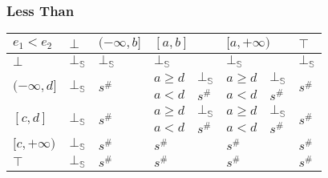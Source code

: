 \documentclass[aspectratio=169]{beamer}
\begin{document}
        \begin{frame}
            \frametitle{Less Than}
    \begin{table}[]
        \begin{tabular}{|l|l|l|ll|ll|l|}
        \hline
        $e_1 < e_2$                     & $\bot$                  & $(-\infty, b]$          & \multicolumn{2}{l|}{$[a, b]$} & \multicolumn{2}{l|}{$[a, +\infty)$} & $\top$                  \\ \hline
        $\bot$                          & $\bot_\mathbb{S}$                  & $\bot_\mathbb{S}$                  & \multicolumn{2}{l|}{$\bot_\mathbb{S}$}   & \multicolumn{2}{l|}{$\bot_\mathbb{S}$}         & $\bot_\mathbb{S}$                  \\ \hline
        \multirow{2}{*}{$(-\infty, d]$} & \multirow{2}{*}{$\bot_\mathbb{S}$} & \multirow{2}{*}{$s^\#$} & $a \ge d$       & $\bot_\mathbb{S}$      & $a \ge d$          & $\bot_\mathbb{S}$         & \multirow{2}{*}{$s^\#$} \\
                                        &                         &                         & $a < d$         & $s^\#$      & $a < d$            & $s^\#$         &                         \\ \hline
        \multirow{2}{*}{$[c, d]$}       & \multirow{2}{*}{$\bot_\mathbb{S}$} & \multirow{2}{*}{$s^\#$} & $a \ge d$       & $\bot_\mathbb{S}$      & $a \ge d$          & $\bot_\mathbb{S}$         & \multirow{2}{*}{$s^\#$} \\
                                        &                         &                         & $a < d$         & $s^\#$      & $a < d$            & $s^\#$         &                         \\ \hline
        $[c, +\infty)$                  & $\bot_\mathbb{S}$                  & $s^\#$                  & \multicolumn{2}{l|}{$s^\#$}   & \multicolumn{2}{l|}{$s^\#$}         & $s^\#$                  \\ \hline
        $\top$                          & $\bot_\mathbb{S}$                  & $s^\#$                  & \multicolumn{2}{l|}{$s^\#$}   & \multicolumn{2}{l|}{$s^\#$}         & $s^\#$                  \\ \hline
        \end{tabular}
        \end{table}
    \end{frame}
    
\end{document}
